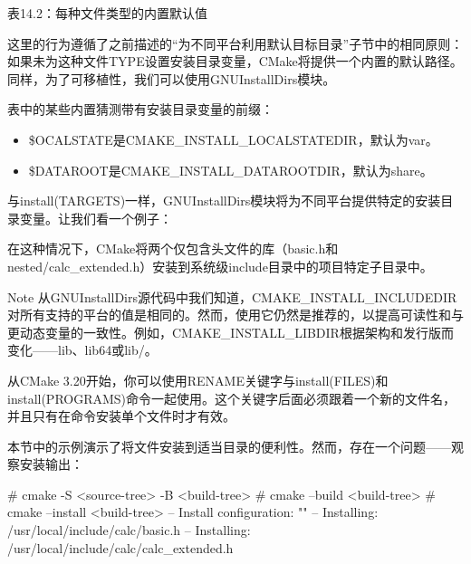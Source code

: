 \begin{center}
表14.2：每种文件类型的内置默认值
\end{center}

这里的行为遵循了之前描述的“为不同平台利用默认目标目录”子节中的相同原则：如果未为这种文件TYPE设置安装目录变量，CMake将提供一个内置的默认路径。同样，为了可移植性，我们可以使用GNUInstallDirs模块。

表中的某些内置猜测带有安装目录变量的前缀：

\begin{itemize}
\item
\$OCALSTATE是CMAKE\_INSTALL\_LOCALSTATEDIR，默认为var。

\item
\$DATAROOT是CMAKE\_INSTALL\_DATAROOTDIR，默认为share。
\end{itemize}

与install(TARGETS)一样，GNUInstallDirs模块将为不同平台提供特定的安装目录变量。让我们看一个例子：



在这种情况下，CMake将两个仅包含头文件的库（basic.h和nested/calc\_extended.h）安装到系统级include目录中的项目特定子目录中。

\begin{myNotic}{Note}
从GNUInstallDirs源代码中我们知道，CMAKE\_INSTALL\_INCLUDEDIR对所有支持的平台的值是相同的。然而，使用它仍然是推荐的，以提高可读性和与更动态变量的一致性。例如，CMAKE\_INSTALL\_LIBDIR根据架构和发行版而变化——lib、lib64或lib/。
\end{myNotic}

从CMake 3.20开始，你可以使用RENAME关键字与install(FILES)和install(PROGRAMS)命令一起使用。这个关键字后面必须跟着一个新的文件名，并且只有在命令安装单个文件时才有效。

本节中的示例演示了将文件安装到适当目录的便利性。然而，存在一个问题——观察安装输出：

\begin{shell}
# cmake -S <source-tree> -B <build-tree>
# cmake --build <build-tree>
# cmake --install <build-tree>
-- Install configuration: ""
-- Installing: /usr/local/include/calc/basic.h
-- Installing: /usr/local/include/calc/calc_extended.h
\end{shell}

